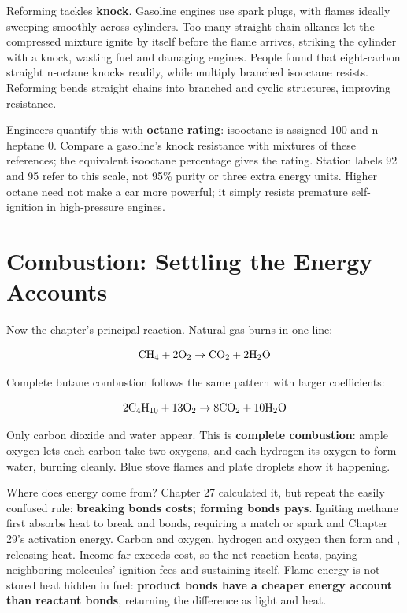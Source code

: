 Reforming tackles \textbf{knock}. Gasoline engines use spark plugs, with flames ideally sweeping smoothly across cylinders. Too many straight-chain alkanes let the compressed mixture ignite by itself before the flame arrives, striking the cylinder with a knock, wasting fuel and damaging engines. People found that eight-carbon straight n-octane knocks readily, while multiply branched isooctane resists. Reforming bends straight chains into branched and cyclic structures, improving resistance.

Engineers quantify this with \textbf{octane rating}: isooctane is assigned 100 and n-heptane 0. Compare a gasoline's knock resistance with mixtures of these references; the equivalent isooctane percentage gives the rating. Station labels 92 and 95 refer to this scale, not 95\% purity or three extra energy units. Higher octane need not make a car more powerful; it simply resists premature self-ignition in high-pressure engines.

\section{Combustion: Settling the Energy Accounts}

Now the chapter's principal reaction. Natural gas burns in one line:

\[\mathrm{CH_4} + \mathrm{2O_2} \rightarrow \mathrm{CO_2} + \mathrm{2H_2O}\]

Complete butane combustion follows the same pattern with larger coefficients:

\[\mathrm{2C_4H_{10}} + \mathrm{13O_2} \rightarrow \mathrm{8CO_2} + \mathrm{10H_2O}\]

Only carbon dioxide and water appear. This is \textbf{complete combustion}: ample oxygen lets each carbon take two oxygens, and each hydrogen its oxygen to form water, burning cleanly. Blue stove flames and plate droplets show it happening.

Where does energy come from? Chapter 27 calculated it, but repeat the easily confused rule: \textbf{breaking bonds costs; forming bonds pays}. Igniting methane first absorbs heat to break  and  bonds, requiring a match or spark and Chapter 29's activation energy. Carbon and oxygen, hydrogen and oxygen then form  and , releasing heat. Income far exceeds cost, so the net reaction heats, paying neighboring molecules' ignition fees and sustaining itself. Flame energy is not stored heat hidden in fuel: \textbf{product bonds have a cheaper energy account than reactant bonds}, returning the difference as light and heat.

